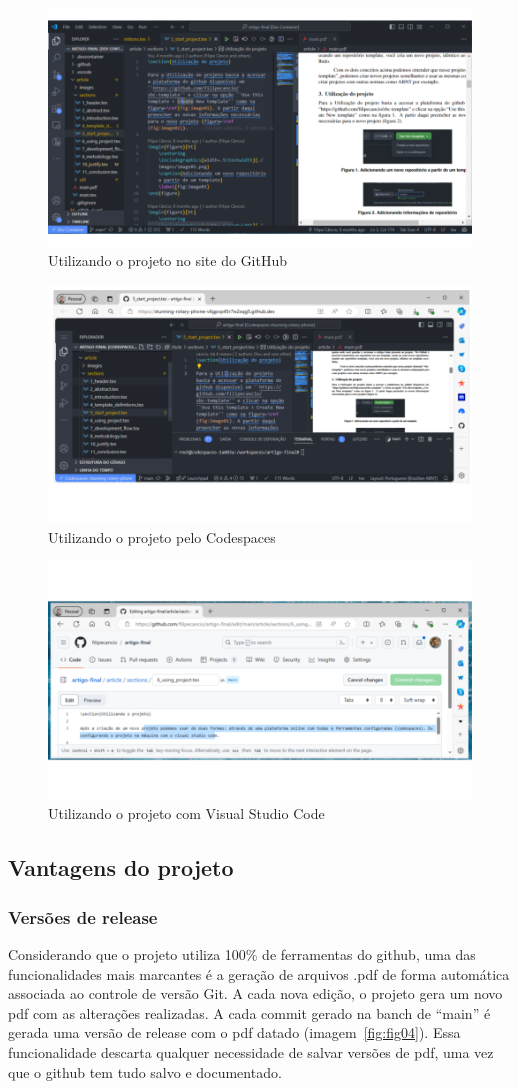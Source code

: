 \begin{figure}[ht]
	\centering
	\includegraphics[width=.6\textwidth]{./images/fig01.png}
	\caption{Utilizando o projeto no site do GitHub}
	\label{fig:fig01}
\end{figure}

\begin{figure}[ht]
	\centering
	\includegraphics[width=.6\textwidth]{./images/fig02.png}
	\caption{Utilizando o projeto pelo Codespaces}
	\label{fig:fig02}
\end{figure}

\begin{figure}[ht]
	\centering
	\includegraphics[width=.6\textwidth]{./images/fig03.png}
	\caption{Utilizando o projeto com Visual Studio Code}
	\label{fig:fig03}
\end{figure}

\subsection{Vantagens do projeto}

\subsubsection{Versões de release}
Considerando que o projeto utiliza 100\% de ferramentas do github, uma das funcionalidades mais marcantes é a geração de arquivos .pdf de forma automática associada ao controle de versão Git. A cada nova edição, o projeto gera um novo pdf com as alterações realizadas. A cada commit gerado na banch de ``main'' é gerada uma versão de release com o pdf datado (imagem~\ref{fig:fig04}). Essa funcionalidade descarta qualquer necessidade de salvar versões de pdf, uma vez que o github tem tudo salvo e documentado.

